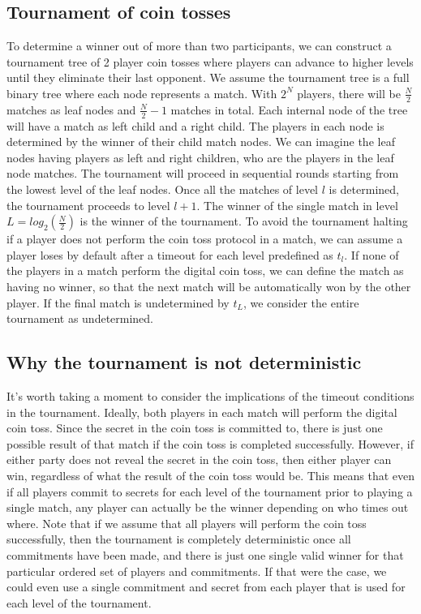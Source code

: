 \subsection{Tournament of coin tosses}
To determine a winner out of more than two participants, we can construct a tournament tree of 2 player coin tosses where players can advance to higher levels until they eliminate their last opponent. We assume the tournament tree is a full binary tree where each node represents a match. With $2^N$ players, there will be $\frac{N}{2}$ matches as leaf nodes and $\frac{N}{2}-1$ matches in total. Each internal node of the tree will have a match as left child and a right child. The players in each node is determined by the winner of their child match nodes. We can imagine the leaf nodes having players as left and right children, who are the players in the leaf node matches. The tournament will proceed in sequential rounds starting from the lowest level of the leaf nodes. Once all the matches of level $l$ is determined, the tournament proceeds to level $l+1$. The winner of the single match in level $L=log_2(\frac{N}{2})$ is the winner of the tournament. To avoid the tournament halting if a player does not perform the coin toss protocol in a match, we can assume a player loses by default after a timeout for each level predefined as $t_l$. If none of the players in a match perform the digital coin toss, we can define the match as having no winner, so that the next match will be automatically won by the other player. If the final match is undetermined by $t_L$, we consider the entire tournament as undetermined.

\subsection{Why the tournament is not deterministic}  %
It's worth taking a moment to consider the implications of the timeout conditions in the tournament. Ideally, both players in each match will perform the digital coin toss. Since the secret in the coin toss is committed to, there is just one possible result of that match if the coin toss is completed successfully. However, if either party does not reveal the secret in the coin toss, then either player can win, regardless of what the result of the coin toss would be. This means that even if all players commit to secrets for each level of the tournament prior to playing a single match, any player can actually be the winner depending on who times out where. Note that if we assume that all players will perform the coin toss successfully, then the tournament is completely deterministic once all commitments have been made, and there is just one single valid winner for that particular ordered set of players and commitments. If that were the case, we could even use a single commitment and secret from each player that is used for each level of the tournament.

